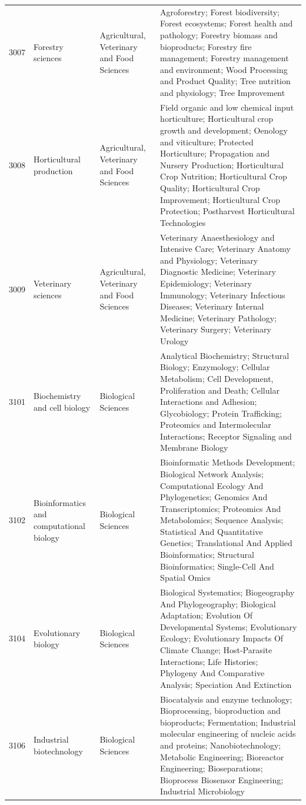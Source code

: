 \begin{longtable}{r p{2.45cm} p{2.55cm} p{6.15cm}}
3007 & Forestry sciences & Agricultural, Veterinary and Food Sciences & Agroforestry; Forest biodiversity; Forest ecosystems; Forest health and pathology; Forestry biomass and bioproducts; Forestry fire management; Forestry management and environment; Wood Processing and Product Quality; Tree nutrition and physiology; Tree Improvement \\
3008 & Horticultural production & Agricultural, Veterinary and Food Sciences & Field organic and low chemical input horticulture; Horticultural crop growth and development; Oenology and viticulture; Protected Horticulture; Propagation and Nursery Production; Horticultural Crop Nutrition; Horticultural Crop Quality; Horticultural Crop Improvement; Horticultural Crop Protection; Postharvest Horticultural Technologies \\
3009 & Veterinary sciences & Agricultural, Veterinary and Food Sciences & Veterinary Anaesthesiology and Intensive Care; Veterinary Anatomy and Physiology; Veterinary Diagnostic Medicine; Veterinary Epidemiology; Veterinary Immunology; Veterinary Infectious Diseases; Veterinary Internal Medicine; Veterinary Pathology; Veterinary Surgery; Veterinary Urology \\
3101 & Biochemistry and cell biology & Biological Sciences & Analytical Biochemistry; Structural Biology; Enzymology; Cellular Metabolism; Cell Development, Proliferation and Death; Cellular Interactions and Adhesion; Glycobiology; Protein Trafficking; Proteomics and Intermolecular Interactions; Receptor Signaling and Membrane Biology \\
3102 & Bioinformatics and computational biology & Biological Sciences & Bioinformatic Methods Development; Biological Network Analysis; Computational Ecology And Phylogenetics; Genomics And Transcriptomics; Proteomics And Metabolomics; Sequence Analysis; Statistical And Quantitative Genetics; Translational And Applied Bioinformatics; Structural Bioinformatics; Single-Cell And Spatial Omics \\
3104 & Evolutionary biology & Biological Sciences & Biological Systematics; Biogeography And Phylogeography; Biological Adaptation; Evolution Of Developmental Systems; Evolutionary Ecology; Evolutionary Impacts Of Climate Change; Host-Parasite Interactions; Life Histories; Phylogeny And Comparative Analysis; Speciation And Extinction \\
3106 & Industrial biotechnology & Biological Sciences & Biocatalysis and enzyme technology; Bioprocessing, bioproduction and bioproducts; Fermentation; Industrial molecular engineering of nucleic acids and proteins; Nanobiotechnology; Metabolic Engineering; Bioreactor Engineering; Bioseparations; Bioprocess Biosensor Engineering; Industrial Microbiology \\

\end{longtable}
